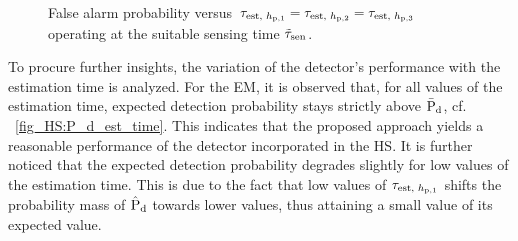 \begin{figure}[!t]

\centering
{}
\caption{False alarm probability versus $\tau_{\text{est, $h_{\text{p,1}}$}} = \tau_{\text{est, $h_{\text{p,2}}$}} = \tau_{\text{est, $h_{\text{p,3}}$}}$ operating at the suitable sensing time $\tilde{\tau}_{\text{sen}}$.}
\label{fig_HS:P_f_est_time}
\end{figure}

To procure further insights, the variation of the detector's performance with the estimation time is analyzed. For the EM, it is observed that, for all values of the estimation time, expected detection probability stays strictly above $\bar{\text{P}}_{\text{d}}$, cf. \figurename~\ref{fig_HS:P_d_est_time}. This indicates that the proposed approach yields a reasonable performance of the detector incorporated in the HS. It is further noticed that the expected detection probability degrades slightly for low values of the estimation time. This is due to the fact that low values of $\tau_{\text{est, $h_{\text{p,1}}$}}$ shifts the probability mass of $\hat{\text{P}}_{\text{d}}$ towards lower values, thus attaining a small value of its expected value. 


